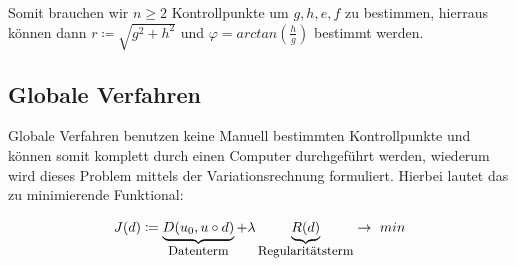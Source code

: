 \documentclass[ngerman]{article}
\theoremstyle{plain}
\theoremstyle{definition}
\numberwithin{equation}{section}
\begin{document}
Somit brauchen wir $n \geq 2$ Kontrollpunkte um $g,h,e,f$ zu bestimmen, hierraus können dann $r \coloneqq \sqrt{g^2+h^2}$ und $\varphi=arctan(\frac{h}{g})$ bestimmt werden.

\subsection{Globale Verfahren}

Globale Verfahren benutzen keine Manuell bestimmten Kontrollpunkte und können somit komplett durch einen Computer durchgeführt werden, wiederum wird dieses Problem mittels der Variationsrechnung formuliert.
Hierbei lautet das zu minimierende Funktional:

\[J(d) \coloneqq \underbrace{D(u_0,u \circ d)}_{\text{\small Datenterm}} + \lambda \underbrace{R(d)}_{\text{\small Regularitätsterm}} \to \ min\]
\end{document}
